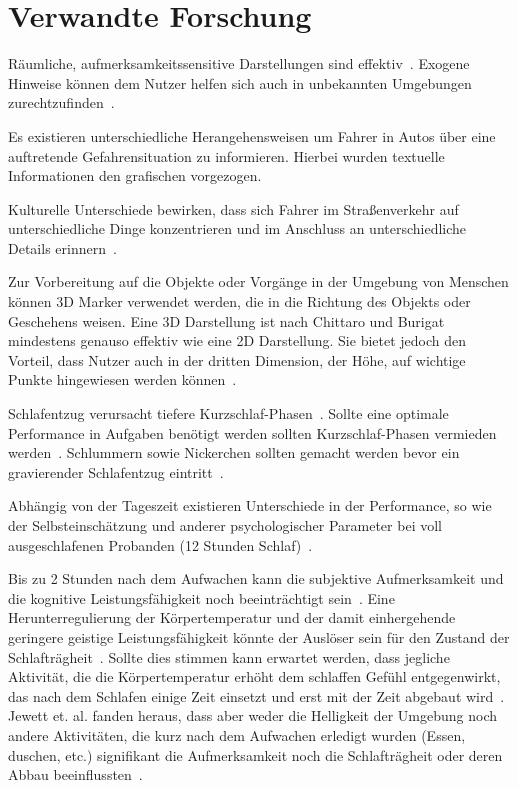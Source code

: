 \chapter{Verwandte Forschung}\label{sec:relatedWork}

Räumliche, aufmerksamkeitssensitive Darstellungen sind effektiv~\cite{bonanni2005attention}. Exogene Hinweise können dem Nutzer helfen sich auch in unbekannten Umgebungen zurechtzufinden~\cite{bonanni2005attention}.

Es existieren unterschiedliche Herangehensweisen um Fahrer in Autos über eine auftretende Gefahrensituation zu informieren. Hierbei wurden textuelle Informationen den grafischen vorgezogen.~\cite{green1995driver}

Kulturelle Unterschiede bewirken, dass sich Fahrer im Straßenverkehr auf unterschiedliche Dinge konzentrieren und im Anschluss an unterschiedliche Details erinnern~\cite{shinohara2017visual}.

Zur Vorbereitung auf die Objekte oder Vorgänge in der Umgebung von Menschen können 3D Marker verwendet werden, die in die Richtung des Objekts oder Geschehens weisen. Eine 3D Darstellung ist nach Chittaro und Burigat mindestens genauso effektiv wie eine 2D Darstellung. Sie bietet jedoch den Vorteil, dass Nutzer auch in der dritten Dimension, der Höhe, auf wichtige Punkte hingewiesen werden können~\cite{chittaro20043d}.

Schlafentzug verursacht tiefere Kurzschlaf-Phasen~\cite{dinges1985assessing}. Sollte eine optimale Performance in Aufgaben benötigt werden sollten Kurzschlaf-Phasen vermieden werden~\cite{dinges1985assessing}. Schlummern sowie Nickerchen sollten gemacht werden bevor ein gravierender Schlafentzug eintritt~\cite{dinges1985assessing}.

Abhängig von der Tageszeit existieren Unterschiede in der Performance, so wie der Selbsteinschätzung und anderer psychologischer Parameter bei voll ausgeschlafenen Probanden (12 Stunden Schlaf)~\cite{kraemer2000time}.

Bis zu 2 Stunden nach dem Aufwachen kann die subjektive Aufmerksamkeit und die kognitive Leistungsfähigkeit noch beeinträchtigt sein~\cite{jewett1999time}. Eine Herunterregulierung der Körpertemperatur und der damit einhergehende geringere geistige Leistungsfähigkeit könnte der Auslöser sein für den Zustand der Schlafträgheit~\cite{dinges1990you}. Sollte dies stimmen kann erwartet werden, dass jegliche Aktivität, die die Körpertemperatur erhöht dem schlaffen Gefühl entgegenwirkt, das nach dem Schlafen einige Zeit einsetzt und erst mit der Zeit abgebaut wird~\cite{jewett1999time}. Jewett et. al. fanden heraus, dass aber weder die Helligkeit der Umgebung noch andere Aktivitäten, die kurz nach dem Aufwachen erledigt wurden (Essen, duschen, etc.) signifikant die Aufmerksamkeit noch die Schlafträgheit oder deren Abbau beeinflussten~\cite{jewett1999time}.

